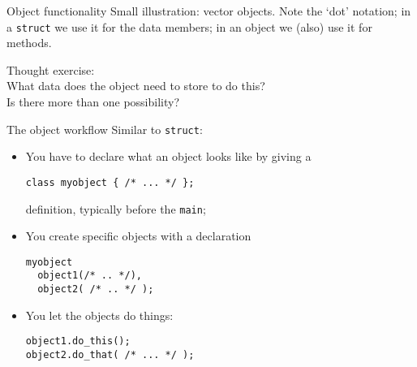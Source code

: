 \begin{block}{Object functionality}
  \label{sl:object-functionality}
  Small illustration: vector objects.
  Note the `dot' notation; in a \lstinline{struct} we use it for the
  data members; in an object we (also) use it for methods.
\end{block}

\begin{exercise}
  \label{ex:pointdesign}
  Thought exercise:\\
  What data does the object need to store to do this?\\
  Is there more than one possibility?
\end{exercise}

\begin{block}{The object workflow}
  \label{sl:object-flow}
  Similar to \lstinline{struct}:
  \begin{itemize}
  \item You have to declare what an object looks like by giving a
\begin{lstlisting}
class myobject { /* ... */ };
\end{lstlisting}
    definition, typically before the
    \lstinline{main};
  \item You create specific objects with a declaration
\begin{lstlisting}
myobject
  object1(/* .. */),
  object2( /* .. */ );    
\end{lstlisting}
  \item You let the objects do things:
\begin{lstlisting}
object1.do_this();
object2.do_that( /* ... */ );
\end{lstlisting}
  \end{itemize}
\end{block}

